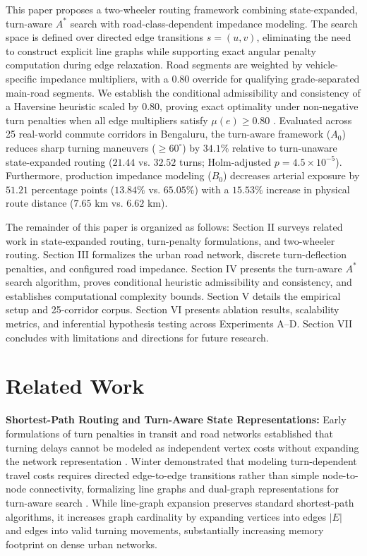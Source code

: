 \documentclass[conference]{IEEEtran}
\begin{document}
This paper proposes a two-wheeler routing framework combining state-expanded, turn-aware $A^*$ search with road-class-dependent impedance modeling. The search space is defined over directed edge transitions $s=(u, v)$, eliminating the need to construct explicit line graphs while supporting exact angular penalty computation during edge relaxation. Road segments are weighted by vehicle-specific impedance multipliers, with a $0.80$ override for qualifying grade-separated main-road segments. We establish the conditional admissibility and consistency of a Haversine heuristic scaled by $0.80$, proving exact optimality under non-negative turn penalties when all edge multipliers satisfy $\mu(e) \ge 0.80$ \cite{hart1968formal}. Evaluated across 25 real-world commute corridors in Bengaluru, the turn-aware framework ($A_0$) reduces sharp turning maneuvers ($\ge 60^\circ$) by $34.1\%$ relative to turn-unaware state-expanded routing ($21.44$ vs. $32.52$ turns; Holm-adjusted $p = 4.5 \times 10^{-5}$). Furthermore, production impedance modeling ($B_0$) decreases arterial exposure by $51.21$ percentage points ($13.84\%$ vs. $65.05\%$) with a $15.53\%$ increase in physical route distance ($7.65\text{ km}$ vs. $6.62\text{ km}$).

The remainder of this paper is organized as follows: Section II surveys related work in state-expanded routing, turn-penalty formulations, and two-wheeler routing. Section III formalizes the urban road network, discrete turn-deflection penalties, and configured road impedance. Section IV presents the turn-aware $A^*$ search algorithm, proves conditional heuristic admissibility and consistency, and establishes computational complexity bounds. Section V details the empirical setup and 25-corridor corpus. Section VI presents ablation results, scalability metrics, and inferential hypothesis testing across Experiments A--D. Section VII concludes with limitations and directions for future research.

\section{Related Work}

\noindent\textbf{Shortest-Path Routing and Turn-Aware State Representations:} Early formulations of turn penalties in transit and road networks established that turning delays cannot be modeled as independent vertex costs without expanding the network representation \cite{kirby1969minimum}. Winter demonstrated that modeling turn-dependent travel costs requires directed edge-to-edge transitions rather than simple node-to-node connectivity, formalizing line graphs and dual-graph representations for turn-aware search \cite{winter2002modeling}. While line-graph expansion preserves standard shortest-path algorithms, it increases graph cardinality by expanding vertices into edges $|E|$ and edges into valid turning movements, substantially increasing memory footprint on dense urban networks.
\end{document}
